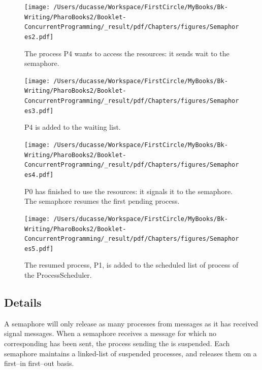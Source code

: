 \documentclass[10pt,twoside,english]{_support/latex/sbabook/sbabook}
\begin{document}
\begin{figure}

\begin{center}
\texttt{[image: /Users/ducasse/Workspace/FirstCircle/MyBooks/Bk-Writing/PharoBooks2/Booklet-ConcurrentProgramming/\_result/pdf/Chapters/figures/Semaphores2.pdf]}\caption{The process P4 wants to access the resources: it sends wait to the semaphore.\label{Sema2}}\end{center}
\end{figure}



\begin{figure}

\begin{center}
\texttt{[image: /Users/ducasse/Workspace/FirstCircle/MyBooks/Bk-Writing/PharoBooks2/Booklet-ConcurrentProgramming/\_result/pdf/Chapters/figures/Semaphores3.pdf]}\caption{P4 is added to the waiting list.\label{Sema3}}\end{center}
\end{figure}



\begin{figure}

\begin{center}
\texttt{[image: /Users/ducasse/Workspace/FirstCircle/MyBooks/Bk-Writing/PharoBooks2/Booklet-ConcurrentProgramming/\_result/pdf/Chapters/figures/Semaphores4.pdf]}\caption{P0 has finished to use the resources: it signals it to the semaphore. The semaphore resumes the first pending process. \label{Sema4}}\end{center}
\end{figure}



\begin{figure}

\begin{center}
\texttt{[image: /Users/ducasse/Workspace/FirstCircle/MyBooks/Bk-Writing/PharoBooks2/Booklet-ConcurrentProgramming/\_result/pdf/Chapters/figures/Semaphores5.pdf]}\caption{The resumed process, P1,  is added to the scheduled list of process of the ProcessScheduler.\label{Sema5}}\end{center}
\end{figure}

\subsection{Details }
A semaphore will only release as many processes from  messages as it has received signal messages.
When a semaphore receives a  message for which no corresponding  has been sent, the process sending the  is suspended.
Each semaphore maintains a linked-list of suspended processes, and releases them on a first–in first–out basis.
\end{document}
